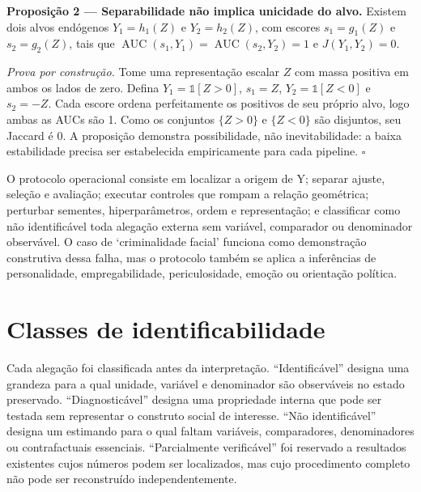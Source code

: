 \begin{boxtext}\textbf{Proposição 2 --- Separabilidade não implica unicidade do alvo.} Existem dois alvos endógenos $Y_1=h_1(Z)$ e $Y_2=h_2(Z)$, com escores $s_1=g_1(Z)$ e $s_2=g_2(Z)$, tais que $\operatorname{AUC}(s_1,Y_1)=\operatorname{AUC}(s_2,Y_2)=1$ e $J(Y_1,Y_2)=0$.

\textit{Prova por construção.} Tome uma representação escalar $Z$ com massa positiva em ambos os lados de zero. Defina $Y_1=\mathbb{1}[Z>0]$, $s_1=Z$, $Y_2=\mathbb{1}[Z<0]$ e $s_2=-Z$. Cada escore ordena perfeitamente os positivos de seu próprio alvo, logo ambas as AUCs são 1. Como os conjuntos $\{Z>0\}$ e $\{Z<0\}$ são disjuntos, seu Jaccard é 0. A proposição demonstra possibilidade, não inevitabilidade: a baixa estabilidade precisa ser estabelecida empiricamente para cada pipeline. $\square$\end{boxtext}

O protocolo operacional consiste em localizar a origem de Y; separar ajuste, seleção e avaliação; executar controles que rompam a relação geométrica; perturbar sementes, hiperparâmetros, ordem e representação; e classificar como não identificável toda alegação externa sem variável, comparador ou denominador observável. O caso de `criminalidade facial' funciona como demonstração construtiva dessa falha, mas o protocolo também se aplica a inferências de personalidade, empregabilidade, periculosidade, emoção ou orientação política.

\section{Classes de identificabilidade}

Cada alegação foi classificada antes da interpretação. ``Identificável'' designa uma grandeza para a qual unidade, variável e denominador são observáveis no estado preservado. ``Diagnosticável'' designa uma propriedade interna que pode ser testada sem representar o construto social de interesse. ``Não identificável'' designa um estimando para o qual faltam variáveis, comparadores, denominadores ou contrafactuais essenciais. ``Parcialmente verificável'' foi reservado a resultados existentes cujos números podem ser localizados, mas cujo procedimento completo não pode ser reconstruído independentemente.


